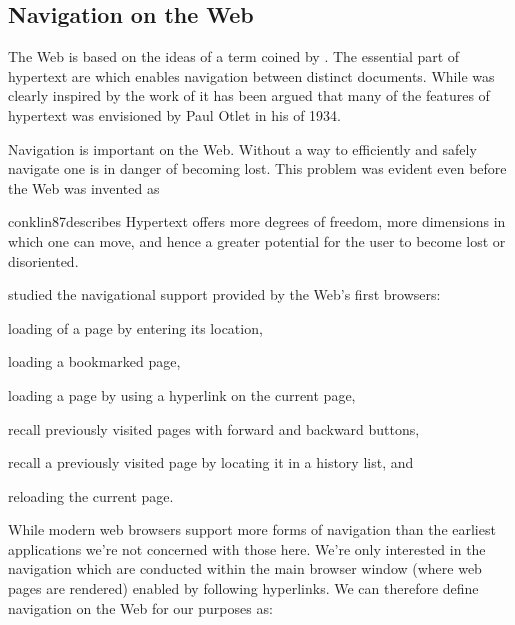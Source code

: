 \subsection{Navigation on the Web}
\label{section:social.navigation.navigation.navigation.on.the.web}

The Web is based on the ideas of \dash{}a term coined by
\citet[]{nelson65}. The essential part of hypertext are
 \citep[]{nelson65} which enables navigation between
distinct documents. While \citeauthor{nelson65} was clearly
inspired by the work of \citet{bush45} it has been argued \citep{rayward94}
that many of the features of hypertext was envisioned by Paul Otlet in his
 of 1934.

Navigation is important on the Web. Without a way to efficiently and safely
navigate one is in danger of becoming lost. This problem was evident even
before the Web was invented as
\begin{fullquote}[\p{38}]{conklin87}{describes}
  Hypertext offers more degrees of freedom, more dimensions in which one
  can move, and hence a greater potential for the user
  to become lost or disoriented.
\end{fullquote}

\citet{jones96} studied the navigational support provided by the Web's first
browsers:
\begin{inparaenum}[(i)]
  \item loading of a page by entering its location,
  \item loading a bookmarked page,
  \item loading a page by using a hyperlink on the current page,
  \item recall previously visited pages with forward and backward buttons,
  \item recall a previously visited page by locating it in a history list, and
  \item reloading the current page.
\end{inparaenum}
While modern web browsers support more forms of navigation%
than the earliest applications we're not concerned with those here.
We're only interested in the navigation which are conducted within the main
browser window (where web pages are rendered) enabled by following hyperlinks.
We can therefore define navigation on the Web for our purposes as:

